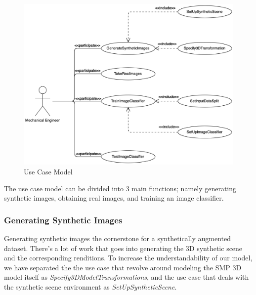 \documentclass[a4paper,12pt,twoside]{report}
\begin{document}
\begin{figure}[h]
\centering
  \includegraphics[width=\textwidth]{UCM}
\caption{Use Case Model}
\label{fig:UCM}
\end{figure}

The use case model can be divided into 3 main functions; namely generating synthetic images, obtaining real images, and training an image classifier.

\subsubsection{Generating Synthetic Images}

Generating synthetic images the cornerstone for a synthetically augmented dataset. There's a lot of work that goes into generating the 3D synthetic scene and the corresponding renditions. To increase the understandability of our model, we have separated the the use case that revolve around modeling the SMP 3D model itself as \textit{Specify3DModelTransformations}, and the use case that deals with the synthetic scene environment as \textit{SetUpSyntheticScene}.
\end{document}
